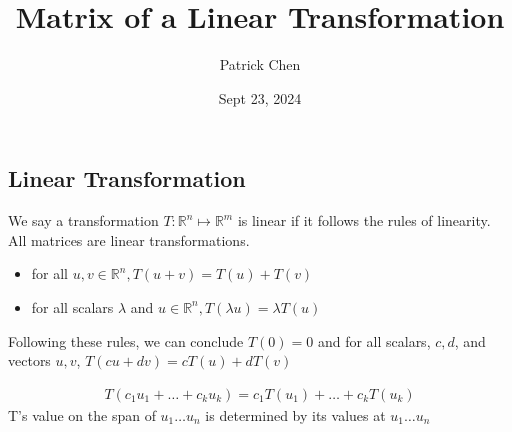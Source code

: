 \documentclass{article}
\title{Matrix of a Linear Transformation}
\author{Patrick Chen}
\date{Sept 23, 2024}
\theoremstyle{mytheoremstyle}
\theoremstyle{mytheoremstyle}
\theoremstyle{myproblemstyle}
\begin{document}
    \maketitle

    \subsection*{Linear Transformation}
    We say a transformation $T: \mathbb{R}^n \mapsto \mathbb{R}^m$ is linear
    if it follows the rules of linearity. All matrices are linear
    transformations.
    \begin{itemize}
        \item for all $u,v\in \mathbb{R}^n, T(u+v) = T(u)+T(v)$
        \item for all scalars $\lambda$ and $u\in \mathbb{R}^n, T(\lambda u) = \lambda T(u)$
    \end{itemize}

    Following these rules, we can conclude $T(0) = 0$ and for all scalars,
    $c,d$, and vectors $u,v$, $T(cu+dv) = cT(u) + dT(v)$

    \begin{align*}
        T(c_1u_1+\dots+c_ku_k) = c_1T(u_1)+\dots+c_kT(u_k)
    \end{align*}
    T's value on the span of $u_1\dots u_n$ is determined by its values at
    $u_1\dots u_n$
\end{document}
